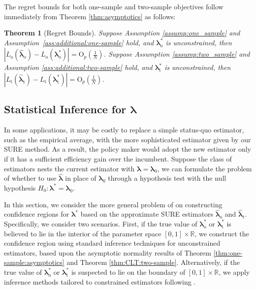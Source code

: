 \documentclass[12pt,letterpaper]{article}
\newtheorem{theorem}{Theorem}[section]
\begin{document}
The regret bounds for both one-sample and two-sample objectives follow immediately from Theorem \ref{thm:asymptotics} as follows:
\begin{theorem}[Regret Bounds]\label{thm:regret}
Suppose Assumption \ref{assump:one_sample} and Assumption~\ref{ass:additional:one-sample} hold, and $\boldsymbol{\lambda}_{\mathrm{o}}^*$ is unconstrained, then $\left|L_{\mathrm{o}}(\hat{\boldsymbol{\lambda}}_{\mathrm{o}})-L_{\mathrm{o}}(\boldsymbol{\lambda}_{\mathrm{o}}^*)\right|=\mathrm{O}_{p}\left(\frac{1}{N}\right)$. Suppose Assumption \ref{assump:two_sample} and Assumption \ref{ass:additional:two-sample} hold, and $\boldsymbol{\lambda}_{\mathrm{t}}^*$ is unconstrained, then $\left|L_{\mathrm{t}}(\hat{\boldsymbol{\lambda}}_{\mathrm{t}})-L_{\mathrm{t}}(\boldsymbol{\lambda}_{\mathrm{t}}^*)\right|=\mathrm{O}_{p}\left(\frac{1}{N}\right)$.   
\end{theorem}

\subsection[Statistical Inference for lambda]{Statistical Inference for $\boldsymbol{\lambda}$}
In some applications, it may be costly to replace a simple status-quo estimator,  such as the empirical average, with the more sophisticated estimator given by our SURE method. As a result, the policy maker would adopt the new estimator only if it has a sufficient efficiency gain over the incumbent. Suppose the class of estimators nests the current estimator with $\boldsymbol{\lambda} = \boldsymbol{\lambda}_0$, we can formulate the problem of whether to use $\hat{\boldsymbol{\lambda}}$ in place of $\boldsymbol{\lambda}_0$ through a hypothesis test with the null hypothesis $H_0: \boldsymbol{\lambda}^* = \boldsymbol{\lambda}_0$.

In this section, we consider the more general problem of on constructing confidence regions for $\boldsymbol{\lambda}^*$ based on the approximate SURE estimators $\hat{\boldsymbol{\lambda}}_{\mathrm{o}}$ and $\hat{\boldsymbol{\lambda}}_{\mathrm{t}}$. Specifically, we consider two scenarios. First, if the true value of $\boldsymbol{\lambda}_{\mathrm{o}}^*$ or $\boldsymbol{\lambda}_{\mathrm{t}}^*$ is believed to lie in the interior of the parameter space $[0,1]\times\mathbb{R}$, we construct the confidence region using standard inference techniques for unconstrained estimators, based upon the asymptotic normality results of Theorem \ref{thm:one-sample:asymptotics} and Theorem \ref{thm:CLT:two-sample}. Alternatively, if the true value of $\boldsymbol{\lambda}_{\mathrm{o}}^*$ or $\boldsymbol{\lambda}_{\mathrm{t}}^*$ is suspected to lie on the boundary of $[0,1]\times\mathbb{R}$, we apply inference methods tailored to constrained estimators following \citet{li2024inference}.
\end{document}
